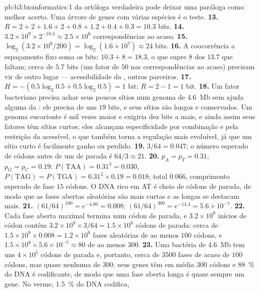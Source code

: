\begin{solution}{pb:b3:bioinformatics:1}
da ortóloga verdadeira pode deixar uma paráloga como melhor acerto. Uma
árvore de genes com várias espécies é o teste.
\textbf{13.} $R = 2 + 2 + 1.6 + 2 + 0.8 + 1.2 + 0.4 + 0.3 = 10.3$ bits.
\textbf{14.} $3.2\times 10^{9}\times 2^{-10.3} \approx 2.5\times 10^{6}$
correspondências ao acaso.
\textbf{15.} $\log_{2}(3.2\times 10^{9}/200) = \log_{2}(1.6\times 10^{7})
\approx 24$ bits.
\textbf{16.} A coocorrência a espaçamento fixo soma os bits: $10.3 + 8 =
18.3$, o que supre $8$ dos $13.7$ que faltam; cerca de $5.7$ bits (um
fator de $50$ nas correspondências ao acaso) precisam vir de outro
lugar --- acessibilidade da , outros parceiros.
\textbf{17.} $H = -(0.5\log_{2}0.5 + 0.5\log_{2}0.5) = 1$ bit; $R = 2 -
1 = 1$ bit.
\textbf{18.} Um fator bacteriano precisa achar seus poucos sítios num
genoma de \qty{4.6}{Mb} sem ajuda alguma da : ele precisa de
uns $19$ bits, e seus sítios são longos e conservados. Um genoma
eucarionte é mil vezes maior e exigiria dez bits a mais, e ainda assim
seus fatores têm sítios curtos; eles alcançam especificidade por
combinação e pela restrição da  acessível, o que também torna
a regulação mais evoluível, já que um sítio curto é facilmente ganho ou
perdido.
\textbf{19.} $3/64 = 0.047$; o número esperado de códons antes de um de
parada é $64/3 \approx 21$.
\textbf{20.} $p_{A} = p_{T} = 0.31$, $p_{G} = p_{C} = 0.19$: $P(\text{TAA})
= 0.31^{3} = 0.030$, $P(\text{TAG}) = P(\text{TGA}) = 0.31^{2}\times 0.19
= 0.018$; total $0.066$, comprimento esperado de fase $15$ códons. O DNA
rico em AT é cheio de códons de parada, de modo que as fases abertas
aleatórias são mais curtas e as longas se destacam mais.
\textbf{21.} $(61/64)^{100} = e^{-4.80} = 0.008$; $(61/64)^{300} =
e^{-14.4} = 5.6\times 10^{-7}$.
\textbf{22.} Cada fase aberta maximal termina num códon de parada, e
$3.2\times
10^{9}$ inícios de códon contêm $3.2\times 10^{9}\times 3/64 = 1.5\times
10^{8}$ códons de parada: cerca de
$1.5\times 10^{8}\times 0.008 = 1.2\times 10^{6}$ fases aleatórias de
ao menos $100$ códons, e $1.5\times 10^{8}\times
5.6\times 10^{-7} \approx 80$ de ao menos $300$.
\textbf{23.} Uma bactéria de \qty{4.6}{Mb} tem uns $4\times 10^{5}$
códons de parada e, portanto, cerca de \num{3500} fases de acaso de
$100$ códons, mas quase nenhuma de $300$; seus genes têm em média $300$
códons e \qty{88}{\%} do DNA é codificante, de modo que uma fase aberta
longa é quase sempre um gene. No verme, \qty{1.5}{\%} do DNA codifica,

\end{solution}
